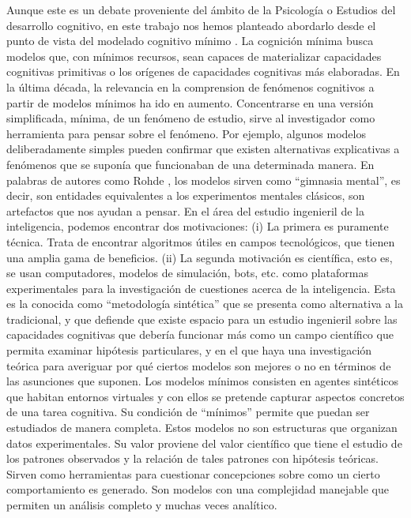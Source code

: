 Aunque este es un debate proveniente del ámbito de la Psicología o Estudios del desarrollo cognitivo, en este trabajo nos hemos planteado abordarlo desde el punto de vista del modelado cognitivo mínimo \cite{Duijn}.
La cognición mínima busca modelos que, con mínimos recursos, sean capaces de materializar capacidades cognitivas primitivas o los orígenes de capacidades cognitivas más elaboradas. En la última década, la relevancia en la comprension de fenómenos cognitivos a partir de modelos mínimos ha ido en aumento.
Concentrarse en una versión simplificada, mínima, de un fenómeno de estudio, sirve al investigador como herramienta para pensar sobre el fenómeno. Por ejemplo, algunos modelos deliberadamente simples pueden confirmar que existen alternativas explicativas a fenómenos que se suponía que funcionaban de una determinada manera. En palabras de autores como Rohde \cite{Rohde}, los modelos sirven como ``gimnasia mental'', es decir, son entidades equivalentes a los experimentos mentales clásicos, son artefactos que nos ayudan a pensar. En el área del estudio ingenieril de la inteligencia, podemos encontrar dos motivaciones: (i) La primera es puramente técnica. Trata de encontrar algoritmos útiles en campos tecnológicos, que tienen una amplia gama de beneficios. (ii) La segunda motivación es científica, esto es, se usan computadores, modelos de simulación, bots, etc. como plataformas experimentales para la investigación de cuestiones acerca de la inteligencia. Esta es la conocida como ``metodología sintética'' que se presenta como alternativa a la tradicional, y que defiende que existe espacio para un estudio ingenieril sobre las capacidades cognitivas que debería funcionar más como un campo científico que permita examinar hipótesis particulares, y en el que haya una investigación teórica para averiguar por qué ciertos modelos son mejores o no en términos de las asunciones que suponen.
Los modelos mínimos consisten en agentes sintéticos que habitan entornos virtuales y con ellos se pretende capturar aspectos concretos de una tarea cognitiva. Su condición de ``mínimos'' permite que puedan ser estudiados de manera completa. Estos modelos no son estructuras que organizan datos experimentales. Su valor proviene del valor científico que tiene el estudio de los patrones observados y la relación de tales patrones con hipótesis teóricas. Sirven como herramientas para cuestionar concepciones sobre como un cierto comportamiento es generado. Son modelos con una complejidad manejable que permiten un análisis completo y muchas veces analítico.
